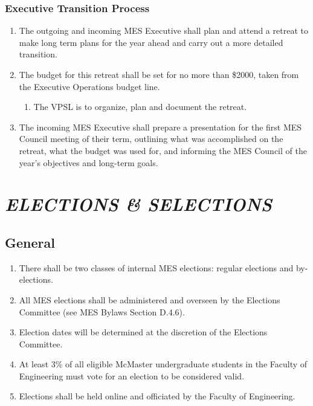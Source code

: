 \hypertarget{executive-transition-process}{%
 \subsubsection{Executive Transition
  Process}
 \label{executive-transition-process}}
\begin{enumerate}
 \item
  The outgoing and incoming MES Executive shall plan and attend a
  retreat to make long term plans for the year ahead and carry out a
  more detailed transition.
 \item
  The budget for this retreat shall be set for no more than \$2000,
  taken from the Executive Operations budget line.

  \begin{enumerate}
   \item
    The VPSL is to organize, plan and document the retreat.
  \end{enumerate}
 \item
  The incoming MES Executive shall prepare a presentation for the first
  MES Council meeting of their term, outlining what was accomplished on
  the retreat, what the budget was used for, and informing the MES
  Council of the year's objectives and long-term goals.
\end{enumerate}

\hypertarget{elections-selections}{%
 \section{\texorpdfstring{\emph{ELECTIONS \&
     SELECTIONS}}{ELECTIONS \& SELECTIONS}}
 \label{elections-selections}}
\hypertarget{general}{%
 \subsection{General}
 \label{general}}
\begin{enumerate}
 \item
  There shall be two classes of internal MES elections: regular
  elections and by-elections.
 \item
  All MES elections shall be administered and overseen by the Elections
  Committee (see MES Bylaws Section D.4.6).
 \item
  Election dates will be determined at the discretion of the Elections
  Committee.
 \item
  At least 3\% of all eligible McMaster undergraduate students in the
  Faculty of Engineering must vote for an election to be considered
  valid.
 \item
  Elections shall be held online and officiated by the Faculty of
  Engineering.

\end{enumerate}

